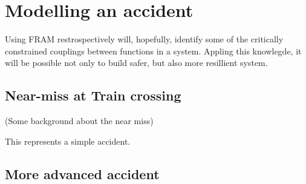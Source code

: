 \chapter{Modelling an accident}
\label{ch:accident_model}
Using FRAM restrospectively will, hopefully, identify some of the critically constrained couplings between functions in a system. Appling this knowlegde, it will be possible not only to build safer, but also more resillient system.

\section{Near-miss at Train crossing}
(Some background about the near miss)

This represents a simple accident.

\section{More advanced accident}